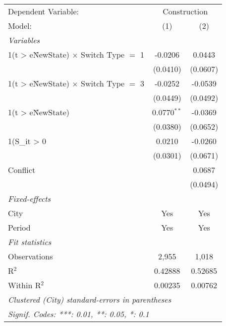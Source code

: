 \begingroup
\centering
\begin{tabular}{lcc}
   \tabularnewline \midrule \midrule
   Dependent Variable: & \multicolumn{2}{c}{Construction}\\
   Model:                                          & (1)           & (2)\\  
   \midrule
   \emph{Variables}\\
   1(t > e\^NewState) $\times$ Switch Type $=$ 1   & -0.0206       & 0.0443\\   
                                                   & (0.0410)      & (0.0607)\\   
   1(t > e\^NewState) $\times$ Switch Type $=$ 3   & -0.0252       & -0.0539\\   
                                                   & (0.0449)      & (0.0492)\\   
   1(t > e\^NewState)                              & 0.0770$^{**}$ & -0.0369\\   
                                                   & (0.0380)      & (0.0652)\\   
   1(S\_{it} > 0                                   & 0.0210        & -0.0260\\   
                                                   & (0.0301)      & (0.0671)\\   
   Conflict                                        &               & 0.0687\\   
                                                   &               & (0.0494)\\   
   \midrule
   \emph{Fixed-effects}\\
   City                                            & Yes           & Yes\\  
   Period                                          & Yes           & Yes\\  
   \midrule
   \emph{Fit statistics}\\
   Observations                                    & 2,955         & 1,018\\  
   R$^2$                                           & 0.42888       & 0.52685\\  
   Within R$^2$                                    & 0.00235       & 0.00762\\  
   \midrule \midrule
   \multicolumn{3}{l}{\emph{Clustered (City) standard-errors in parentheses}}\\
   \multicolumn{3}{l}{\emph{Signif. Codes: ***: 0.01, **: 0.05, *: 0.1}}\\
\end{tabular}
\par\endgroup
